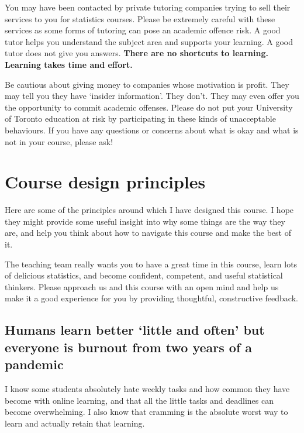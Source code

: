 \documentclass[
  openany]{book}
\begin{document}
You may have been contacted by private tutoring companies trying to sell their services to you for statistics courses. Please be extremely careful with these services as some forms of tutoring can pose an academic offence risk. A good tutor helps you understand the subject area and supports your learning. A good tutor does not give you answers. \textbf{There are no shortcuts to learning. Learning takes time and effort.}

Be cautious about giving money to companies whose motivation is profit. They may tell you they have `insider information'. They don't. They may even offer you the opportunity to commit academic offenses. Please do not put your University of Toronto education at risk by participating in these kinds of unacceptable behaviours. If you have any questions or concerns about what is okay and what is not in your course, please ask!

\hypertarget{course-design-principles}{%
\section{Course design principles}\label{course-design-principles}}

Here are some of the principles around which I have designed this course. I hope they might provide some useful insight into why some things are the way they are, and help you think about how to navigate this course and make the best of it.

The teaching team really wants you to have a great time in this course, learn lots of delicious statistics, and become confident, competent, and useful statistical thinkers. Please approach us and this course with an open mind and help us make it a good experience for you by providing thoughtful, constructive feedback.

\hypertarget{humans-learn-better-little-and-often-but-everyone-is-burnout-from-two-years-of-a-pandemic}{%
\subsection{Humans learn better `little and often' but everyone is burnout from two years of a pandemic}\label{humans-learn-better-little-and-often-but-everyone-is-burnout-from-two-years-of-a-pandemic}}

I know some students absolutely hate weekly tasks and how common they have become with online learning, and that all the little tasks and deadlines can become overwhelming. I also know that cramming is the absolute worst way to learn and actually retain that learning.
\end{document}
